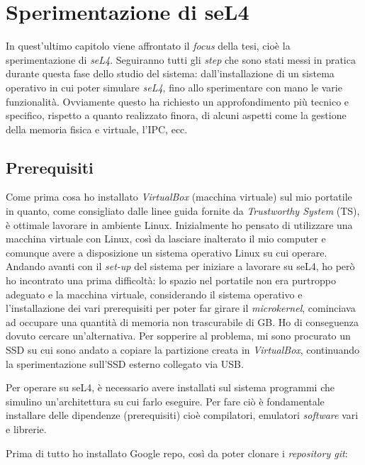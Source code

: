 \chapter{Sperimentazione di seL4}
In quest'ultimo capitolo viene affrontato il \textit{focus} della tesi, cioè la sperimentazione di \textit{seL4}. Seguiranno tutti gli \textit{step} che sono stati messi in pratica durante questa fase dello studio del sistema: dall'installazione di un sistema operativo in cui poter simulare \textit{seL4}, fino allo sperimentare con mano le varie funzionalità. Ovviamente questo ha richiesto un approfondimento più tecnico e specifico, rispetto a quanto realizzato finora, di alcuni aspetti come la gestione della memoria fisica e virtuale, l'IPC, ecc.

\section{Prerequisiti}
Come prima cosa ho installato \textit{VirtualBox} (macchina virtuale) sul mio portatile in quanto, come consigliato dalle linee guida fornite da \textit{Trustworthy System} (TS), è ottimale lavorare in ambiente Linux. Inizialmente ho pensato di utilizzare una macchina virtuale con Linux, così da lasciare inalterato il mio computer e comunque avere a disposizione un sistema operativo Linux su cui operare. Andando avanti con il \textit{set-up} del sistema per iniziare a lavorare su seL4, ho però ho incontrato una prima difficoltà: lo spazio nel portatile non era purtroppo adeguato e la macchina virtuale, considerando il sistema operativo e l'installazione dei vari prerequisiti per poter far girare il \textit{microkernel}, cominciava ad occupare una quantità di memoria non trascurabile di GB. Ho di conseguenza dovuto cercare un'alternativa. Per sopperire al problema, mi sono procurato un SSD su cui sono andato a copiare la partizione creata in \textit{VirtualBox}, continuando la sperimentazione sull'SSD esterno collegato via USB.

Per operare su seL4, è necessario avere installati sul sistema programmi che simulino un'architettura su cui farlo eseguire. Per fare ciò è fondamentale installare delle dipendenze (prerequisiti) cioè compilatori, emulatori \textit{software} vari e librerie.

Prima di tutto ho installato Google repo, così da poter clonare i \textit{repository git}:

